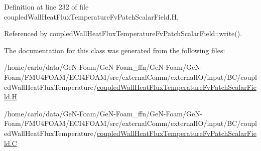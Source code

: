 Definition at line 232 of file coupled\+Wall\+Heat\+Flux\+Temperature\+Fv\+Patch\+Scalar\+Field.\+H.



Referenced by coupled\+Wall\+Heat\+Flux\+Temperature\+Fv\+Patch\+Scalar\+Field\+::write().



The documentation for this class was generated from the following files\+:\begin{DoxyCompactItemize}
\item 
/home/carlo/data/\+Ge\+N-\/\+Foam/\+Ge\+N-\/\+Foam\+\_\+ffn/\+Ge\+N-\/\+Foam/\+Ge\+N-\/\+Foam/\+F\+M\+U4\+F\+O\+A\+M/\+E\+C\+I4\+F\+O\+A\+M/src/external\+Comm/external\+I\+O/input/\+B\+C/coupled\+Wall\+Heat\+Flux\+Temperature/\hyperlink{coupledWallHeatFluxTemperatureFvPatchScalarField_8H}{coupled\+Wall\+Heat\+Flux\+Temperature\+Fv\+Patch\+Scalar\+Field.\+H}\item 
/home/carlo/data/\+Ge\+N-\/\+Foam/\+Ge\+N-\/\+Foam\+\_\+ffn/\+Ge\+N-\/\+Foam/\+Ge\+N-\/\+Foam/\+F\+M\+U4\+F\+O\+A\+M/\+E\+C\+I4\+F\+O\+A\+M/src/external\+Comm/external\+I\+O/input/\+B\+C/coupled\+Wall\+Heat\+Flux\+Temperature/\hyperlink{coupledWallHeatFluxTemperatureFvPatchScalarField_8C}{coupled\+Wall\+Heat\+Flux\+Temperature\+Fv\+Patch\+Scalar\+Field.\+C}\end{DoxyCompactItemize}
